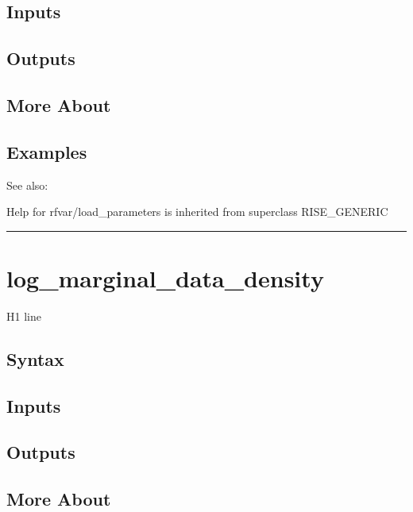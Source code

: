 \documentclass[letterpaper,10pt,english]{sphinxmanual}
\begin{document}
\subsection{Inputs}
\label{classes/models/@rfvar/rfvar:id51}

\subsection{Outputs}
\label{classes/models/@rfvar/rfvar:id52}

\subsection{More About}
\label{classes/models/@rfvar/rfvar:id53}

\subsection{Examples}
\label{classes/models/@rfvar/rfvar:id54}
See also:

Help for rfvar/load\_parameters is inherited from superclass RISE\_GENERIC


\bigskip\hrule{}\bigskip



\section{log\_marginal\_data\_density}
\label{classes/models/@rfvar/rfvar:id55}\label{classes/models/@rfvar/rfvar:log-marginal-data-density}
H1 line


\subsection{Syntax}
\label{classes/models/@rfvar/rfvar:id56}

\subsection{Inputs}
\label{classes/models/@rfvar/rfvar:id57}

\subsection{Outputs}
\label{classes/models/@rfvar/rfvar:id58}

\subsection{More About}
\label{classes/models/@rfvar/rfvar:id59}
\end{document}
